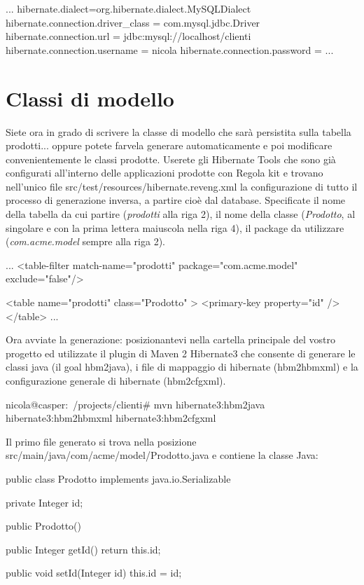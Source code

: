 \begin{bash}
...
hibernate.dialect=org.hibernate.dialect.MySQLDialect
hibernate.connection.driver_class = com.mysql.jdbc.Driver
hibernate.connection.url = jdbc:mysql://localhost/clienti
hibernate.connection.username = nicola
hibernate.connection.password = 
...
\end{bash}


\section{Classi di modello}\label{sec:gsmodello}
Siete ora in grado di scrivere la classe di modello che sarà persistita sulla tabella prodotti... oppure potete farvela generare automaticamente e poi modificare convenientemente le classi prodotte. Userete gli Hibernate Tools che sono già configurati all'interno delle applicazioni prodotte con Regola kit e trovano nell'unico file src/test/resources/hibernate.reveng.xml la configurazione di tutto il processo di generazione inversa, a partire cioè dal database. Specificate il nome della tabella da cui partire (\emph{prodotti} alla riga 2), il nome della classe (\emph{Prodotto}, al singolare e con la prima lettera maiuscola nella riga 4), il package da utilizzare (\emph{com.acme.model} sempre alla riga 2).

\begin{bash}
...  
  <table-filter match-name="prodotti"  package="com.acme.model" exclude="false"/>

   <table name="prodotti" class="Prodotto" >
      <primary-key property="id" />
   </table>
...
\end{bash}

Ora avviate la generazione: posizionantevi nella cartella principale del vostro progetto ed utilizzate il plugin di Maven 2 Hibernate3 che consente di generare le classi java (il goal hbm2java), i file di mappaggio di hibernate (hbm2hbmxml) e la configurazione generale di hibernate (hbm2cfgxml). 

\begin{bash}
nicola@casper:~/projects/clienti# mvn hibernate3:hbm2java hibernate3:hbm2hbmxml hibernate3:hbm2cfgxml
\end{bash}

Il primo file generato si trova nella posizione src/main/java/com/acme/model/Prodotto.java e contiene la classe Java:


\begin{java}
public class Prodotto  implements java.io.Serializable {
    
    private Integer id;

    public Prodotto() {
    }

    public Integer getId() {
        return this.id;
    }
    
    public void setId(Integer id) {
        this.id = id;
    }
}
\end{java}

